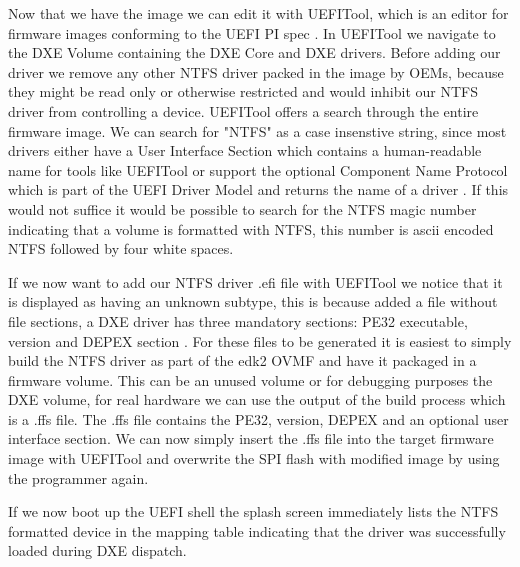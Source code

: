 Now that we have the image we can edit it with UEFITool, which is an editor for firmware images conforming to the UEFI PI spec \cite{uefitool}.
In UEFITool we navigate to the DXE Volume containing the DXE Core and DXE drivers.
Before adding our driver we remove any other NTFS driver packed in the image by OEMs, because they might be read only or otherwise restricted and would inhibit our NTFS driver from controlling a device. UEFITool offers a search through the entire firmware image. We can search for "NTFS" as a case insenstive string, since most drivers either have a User Interface Section which contains a human-readable name for tools like UEFITool\cite[Vol 3, 3.2.5]{pi-spec} or support the optional Component Name Protocol which is part of the UEFI Driver Model and returns the name of a driver \cite[11.5]{uefi-spec}. If this would not suffice it would be possible to search for the NTFS magic number indicating that a volume is formatted with NTFS, this number is ascii encoded NTFS followed by four white spaces.

If we now want to add our NTFS driver .efi file with UEFITool we notice that it is displayed as having an unknown subtype, this is because added a file without file sections, a DXE driver has three mandatory sections: PE32 executable, version and DEPEX section \cite[Vol 3, 2.1.4.1.4]{pi-spec}.
For these files to be generated it is easiest to simply build the NTFS driver as part of the edk2 OVMF and have it packaged in a firmware volume. This can be an unused volume or for debugging purposes the DXE volume, for real hardware we can use the output of the build process which is a .ffs file. The .ffs file contains the PE32, version, DEPEX and an optional user interface section.
We can now simply insert the .ffs file into the target firmware image with UEFITool and overwrite the SPI flash with modified image by using the programmer again.

If we now boot up the UEFI shell the splash screen immediately lists the NTFS formatted device in the mapping table indicating that the driver was successfully loaded during DXE dispatch.

